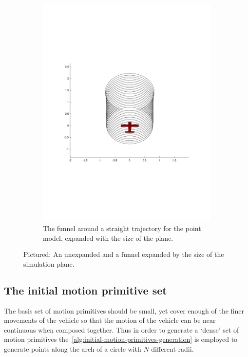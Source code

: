 \begin{figure}
\begin{subfigure}{0.5\textwidth}
    \includegraphics[trim={2cm 5cm 0cm 5cm},
    width=\textwidth]{figures/experiments/expanded-funnel-with-plane}
    \caption{The funnel around a straight trajectory for the point model,
      expanded with the size of the plane.}
  \end{subfigure}
  \caption{Pictured: An unexpanded and a funnel expanded by the size of the
    simulation plane.}
  \label{fig:expanded-and-unexpanded}
\end{figure}

\subsection{The initial motion primitive set}
\label{subsec:initial-motion-primitive}

The basis set of motion primitives should be small, yet cover enough of the
finer movements of the vehicle so that the motion of the vehicle can be near
continuous when composed together. Thus in order to generate a `dense' set of
motion primitives the~\cref{alg:initial-motion-primitives-generation} is
employed to generate points along the arch of a circle with \(N\) different
radii.

